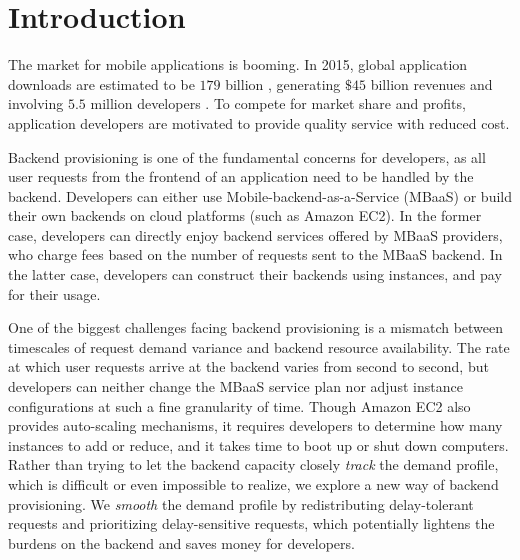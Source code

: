 \section{Introduction}

The market for mobile applications is booming. In 2015, global application downloads are estimated to be $179$ billion \cite{downloads}, generating $\$45$ billion revenues \cite{revenue} and involving $5.5$ million developers \cite{developer}. To compete for market share and profits, application developers are motivated to provide quality service with reduced cost.

Backend provisioning is one of the fundamental concerns for developers, as all user requests from the frontend of an application need to be handled by the backend. Developers can either use Mobile-backend-as-a-Service (MBaaS) or build their own backends on cloud platforms (such as Amazon EC2). In the former case, developers can directly enjoy backend services offered by MBaaS providers, who charge fees based on the number of requests sent to the MBaaS backend.  In the latter case, developers can construct their backends using instances, and pay for their usage.

One of the biggest challenges facing backend provisioning is a mismatch between timescales of request demand variance and backend resource availability. The rate at which user requests arrive at the backend varies from second to second, but developers can neither change the MBaaS service plan nor adjust instance configurations at such a fine granularity of time. Though Amazon EC2 also provides auto-scaling mechanisms, it requires developers to determine how many instances to add or reduce, and it takes time to boot up or shut down computers. Rather than trying to let the backend capacity closely \emph{track} the demand profile, which is difficult or even impossible to realize, we explore a new way of backend provisioning. We \emph{smooth} the demand profile by redistributing delay-tolerant requests and prioritizing delay-sensitive requests, which potentially lightens the burdens on the backend and saves money for developers.

